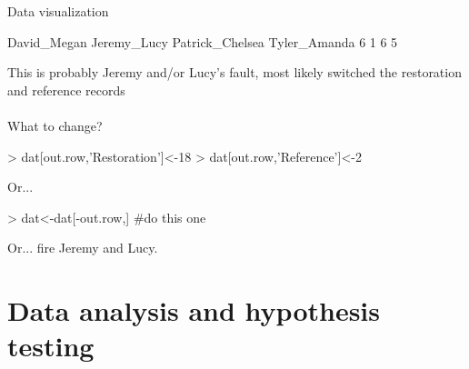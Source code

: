 \documentclass[xcolor=svgnames]{beamer}
\begin{document}
\begin{frame}[fragile]{Data visualization}
\begin{Schunk}
\end{Schunk}
\scriptsize
\begin{Schunk}
\begin{Soutput}
    David_Megan     Jeremy_Lucy Patrick_Chelsea    Tyler_Amanda 
              6               1               6               5 
\end{Soutput}
\end{Schunk}
\normalsize
\vspace{0.2in}
This is probably Jeremy and/or Lucy's fault, most likely switched the restoration and reference records \\~\\
What to change?

\begin{Schunk}
\begin{Sinput}
> dat[out.row,'Restoration']<-18
> dat[out.row,'Reference']<-2
\end{Sinput}
\end{Schunk}
Or...
\begin{Schunk}
\begin{Sinput}
> dat<-dat[-out.row,] #do this one
\end{Sinput}
\end{Schunk}
Or...
fire Jeremy and Lucy.
\end{frame}

\section{Data analysis and hypothesis testing}
\end{document}
